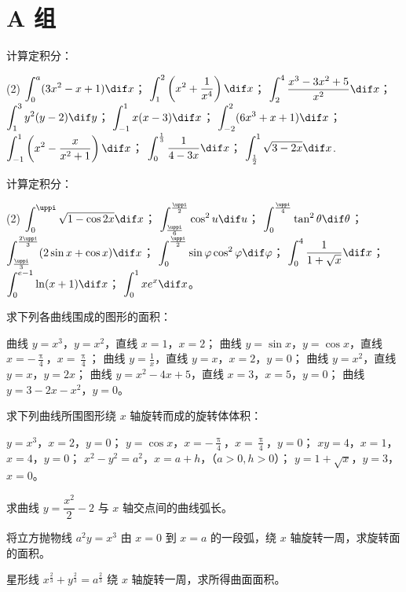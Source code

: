 \section*{A 组}
\begin{question}
  \item 计算定积分：
  \begin{tasks}(2)
    \task $\displaystyle \int_0^a (3x^2-x+1) \dif x$；
    \task $\displaystyle \int_1^2 \left(x^2+\frac{1}{x^4}\right) \dif x$；
    \task $\displaystyle \int_2^4 \frac{x^3-3x^2+5}{x^2} \dif x$；
    \task $\displaystyle \int_1^3 y^2(y-2) \dif y$；
    \task $\displaystyle \int_{-1}^{1} x(x-3) \dif x$；
    \task $\displaystyle \int_{-2}^{2} (6x^3+x+1) \dif x$；
    \task $\displaystyle \int_{-1}^{1} \left(x^2-\frac{x}{x^2+1}\right) \dif x$；
    \task $\displaystyle \int_{0}^{\frac{1}{3}} \frac{1}{4-3x} \dif x$；
    \task $\displaystyle \int_{\frac{1}{2}}^{1} \sqrt{3-2x} \dif x$.
  \end{tasks}
  \item 计算定积分：
  \begin{tasks}(2)
    \task $\displaystyle \int_0^{\uppi} \sqrt{1-\cos2x} \dif x$；
    \task $\displaystyle \int_{\frac{\uppi}{6}}^{\frac{\uppi}{2}} \cos^2u \dif u$；
    \task $\displaystyle \int_0^{\frac{\uppi}{4}} \tan^2\theta \dif \theta$；
    \task $\displaystyle \int_{\frac{\uppi}{3}}^{\frac{2\uppi}{3}} (2\sin x+\cos x) \dif x$；
    \task $\displaystyle \int_0^{\frac{\uppi}{2}} \sin\varphi\cos^2\varphi \dif \varphi$；
    \task $\displaystyle \int_0^4 \frac{1}{1+\sqrt{x}} \dif x$；
    \task $\displaystyle \int_0^{e-1} \ln(x+1) \dif x$；
    \task $\displaystyle \int_0^1 xe^x \dif x$。
  \end{tasks}
  \item 求下列各曲线围成的图形的面积：
  \begin{tasks}
    \task 曲线 $y=x^3$，$y=x^2$，直线 $x=1$，$x=2$；
    \task 曲线 $y=\sin x$，$y=\cos x$，直线 $x=-\frac{\uppi}{4}$，$x=\frac{\uppi}{4}$；
    \task 曲线 $y=\frac{1}{x}$，直线 $y=x$，$x=2$，$y=0$；
    \task 曲线 $y=x^2$，直线 $y=x$，$y=2x$；
    \task 曲线 $y=x^2-4x+5$，直线 $x=3$，$x=5$，$y=0$；
    \task 曲线 $y=3-2x-x^2$，$y=0$。
  \end{tasks}
  \item 求下列曲线所围图形绕 $x$ 轴旋转而成的旋转体体积：
  \begin{tasks}
    \task $y=x^3$，$x=2$，$y=0$；
    \task $y=\cos x$，$x=-\frac{\uppi}{4}$，$x=\frac{\uppi}{4}$，$y=0$；
    \task $xy=4$，$x=1$，$x=4$，$y=0$；
    \task $x^2-y^2=a^2$，$x=a+h$，（$a>0,h>0$）；
    \task $y=1+\sqrt{x}$，$y=3$，$x=0$。
  \end{tasks}
  \item 求曲线 $y=\dfrac{x^2}{2}-2$ 与 $x$ 轴交点间的曲线弧长。
  \item 将立方抛物线 $a^2y=x^3$ 由 $x=0$ 到 $x=a$ 的一段弧，绕 $x$ 轴旋转一周，求旋转面的面积。
  \item 星形线 $x^{\frac{2}{3}}+y^{\frac{2}{3}}=a^{\frac{2}{3}}$ 绕 $x$ 轴旋转一周，求所得曲面面积。
\end{question}
